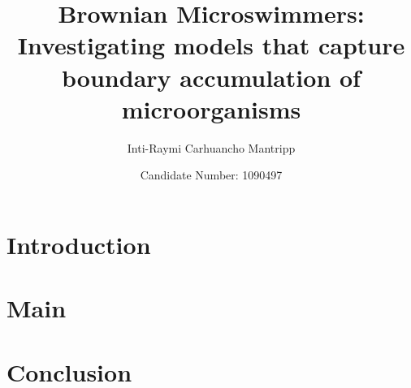 \documentclass[12pt,a4paper]{article}
\title{Brownian Microswimmers: Investigating models that capture boundary accumulation of microorganisms}
\author{Inti-Raymi Carhuancho Mantripp}
\date{Candidate Number: 1090497}
\begin{document}
\maketitle

\thispagestyle{empty}

\newpage
\setcounter{page}{1}


\section{Introduction}\label{sec: intro}

\section{Main}\label{sec:2_models_and_preamble}

\section{Conclusion}

\printbibliography
\end{document}
